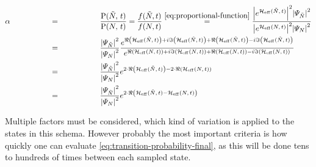 \begin{equation}
    \label{eq:transition-probability-final}
    \begin{split}
        \alpha &\stackrel{\phantom{\ref{eq:proportional-function}}}{=} \frac{\probabilityOf{\tilde{N}}{t}}{\probabilityOf{N}{t}} =  \frac{f(\tilde{N},t)}{f(N,t)}
        \stackrel{\ref{eq:proportional-function}}{=}
        \frac{
            \absSquare{e^{\HeffOft[\tilde{N}]}} \absSquare{\psiN[\tilde{N}]}
        }{
            \absSquare{e^{\HeffOft}} \absSquare{\psiN}
        }\\
        &\stackrel{\phantom{\ref{eq:proportional-function}}}{=}
        \frac{\absSquare{\psiN[\tilde{N}]}}{\absSquare{\psiN}}
        \frac{
            e^{\real\left(\HeffOft[\tilde{N}]\right) + i\imaginary\left(\HeffOft[\tilde{N}]\right) +\real\left(\HeffOft[\tilde{N}]\right)-i \imaginary\left(\HeffOft[\tilde{N}]\right)}
        }{
            e^{\real\left(\HeffOft\right) + i\imaginary\left(\HeffOft\right) +\real\left(\HeffOft\right)-i \imaginary\left(\HeffOft\right)}
        }\\
        &\stackrel{\phantom{\ref{eq:proportional-function}}}{=}
        \frac{\absSquare{\psiN[\tilde{N}]}}{\absSquare{\psiN}}
        e^{2\cdot \real\left(\HeffOft[\tilde{N}]\right) - 2\cdot \real\left(\HeffOft\right)}\\
        &\stackrel{\phantom{\ref{eq:proportional-function}}}{=}
        \frac{\absSquare{\psiN[\tilde{N}]}}{\absSquare{\psiN}}
        e^{2\cdot \real\left(\HeffOft[\tilde{N}] - \HeffOft\right)}
    \end{split}
\end{equation}

Multiple factors must be considered, which kind of variation is applied to the states in this schema. 
However probably the most important criteria is how quickly one can evaluate \autoref{eq:transition-probability-final}, as this will be done tens to hundreds of times between each sampled state.